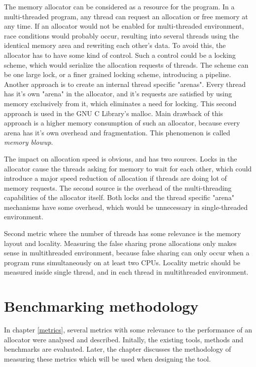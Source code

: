 The memory allocator can be considered as a resource for the program. In a
multi-threaded program, any thread can request an allocation or free memory at
any time. If an allocator would not be enabled for multi-threaded environment,
race conditions would probably occur, resulting into several threads using the
identical memory area and rewriting each other's data. To avoid this, the
allocator has to have some kind of control. Such a control could be a locking
scheme, which would serialize the allocation requests of threads. The scheme can
be one large lock, or a finer grained locking scheme, introducing a pipeline.
Another approach is to create an internal thread specific "arenas". Every thread
has it's own "arena" in the allocator, and it's requests are satisfied by using
memory exclusively from it, which eliminates a need for locking. This second
approach is used in the GNU C Library's malloc. Main drawback of this approach is
a higher memory consumption of such an allocator, because every arena has it's
own overhead and fragmentation. This phenomenon is called {\em memory blowup}.

The impact on allocation speed is obvious, and has two sources. Locks in the
allocator cause the threads asking for memory to wait for each other, which could
introduce a major speed reduction of allocation if threads are doing lot of
memory requests. The second source is the overhead of the multi-threading
capabilities of the allocator itself. Both locks and the thread specific "arena"
mechanisms have some overhead, which would be unnecessary in single-threaded
environment.

Second metric where the number of threads has some relevance is the memory layout
and locality. Measuring the false sharing prone allocations only makes sense in
multithreaded environment, because false sharing can only occur when a program
runs simultaneously on at least two CPUs. Locality metric should be measured
inside single thread, and in each thread in multithreaded environment.

\chapter{Benchmarking methodology}
\label{methodology}

In chapter \ref{metrics}, several metrics with some relevance to the performance
of an allocator were analysed and described. Initally, the existing tools, methods and benchmarks are evaluated. Later, the chapter discusses the methodology of measuring these metrics which will be used when designing the tool.

